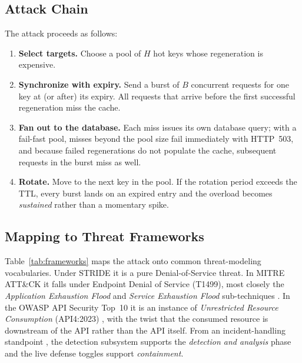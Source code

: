 \documentclass[preprint,12pt]{elsarticle}
\begin{document}
\subsection{Attack Chain}
The attack proceeds as follows:
\begin{enumerate}[leftmargin=*]
\item \textbf{Select targets.} Choose a pool of $H$ hot keys whose regeneration is
expensive.
\item \textbf{Synchronize with expiry.} Send a burst of $B$ concurrent requests for one
key at (or after) its expiry. All requests that arrive before the first successful
regeneration miss the cache.
\item \textbf{Fan out to the database.} Each miss issues its own database query; with
a fail-fast pool, misses beyond the pool size fail immediately with HTTP~503, and
because failed regenerations do not populate the cache, subsequent requests in the
burst miss as well.
\item \textbf{Rotate.} Move to the next key in the pool. If the rotation period
exceeds the TTL, every burst lands on an expired entry and the overload becomes
\emph{sustained} rather than a momentary spike.
\end{enumerate}

\subsection{Mapping to Threat Frameworks}
Table~\ref{tab:frameworks} maps the attack onto common threat-modeling vocabularies.
Under STRIDE \cite{shostack2014} it is a pure Denial-of-Service threat. In MITRE
ATT\&CK it falls under Endpoint Denial of Service (T1499), most closely the
\emph{Application Exhaustion Flood} and \emph{Service Exhaustion Flood} sub-techniques
\cite{mitret1499}. In the OWASP API Security Top~10 it is an instance of
\emph{Unrestricted Resource Consumption} (API4:2023) \cite{owaspapi2023}, with the
twist that the consumed resource is downstream of the API rather than the API itself.
From an incident-handling standpoint \cite{nist80061}, the detection subsystem
supports the \emph{detection and analysis} phase and the live defense toggles support
\emph{containment}.
\end{document}
